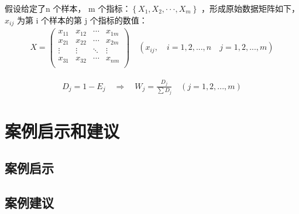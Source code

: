 假设给定了n 个样本， m 个指标：$\left\{ X_{1},X_{2},\cdot\cdot\cdot,X_{m}\right\}$ ，形成原始数据矩阵如下，$x_{ij}$ 为第 i 个样本的第 j 个指标的数值：
\begin{equation}
\begin{aligned}
X=\begin{pmatrix} x_{11} & x_{12} & \cdots & x_{1m} \\ x_{21} & x_{22} & \cdots & x_{2m} \\ \vdots & \vdots & \ddots & \vdots \\ x_{31}& x_{32} & \cdots &x_{nm} \\ \end{pmatrix}\quad (x_{ij},\quad i=1,2,...,n\quad j=1,2,...,m)
  \label{eq:matrix-x}
\end{aligned}
\end{equation}


\begin{equation}
\begin{aligned}
D_j=1-E_j \quad \Rightarrow \quad W_j=\frac{D_j}{\sum D_j}\quad (j=1,2,...,m)
  \label{eq:dj}
\end{aligned}
\end{equation}

\chapter{案例启示和建议}
\section{案例启示}
\section{案例建议}